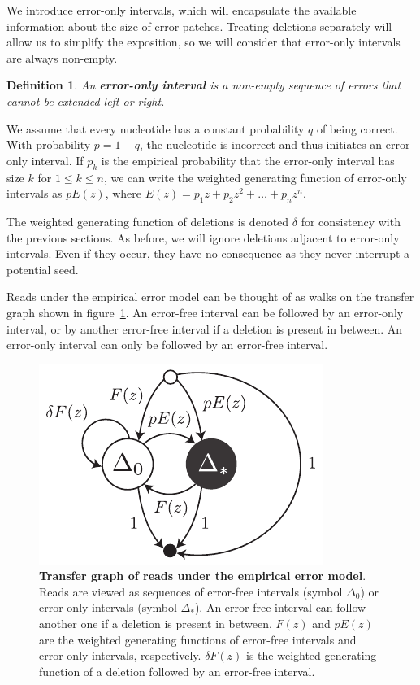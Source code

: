 \documentclass{article}
\newtheorem{definition}{Definition}
\begin{document}
We introduce error-only intervals, which will encapsulate the available
information about the size of error patches. Treating deletions separately
will allow us to simplify the exposition, so we will consider that
error-only intervals are always non-empty.

\begin{definition}
\label{def:error-interval}
An \textbf{error-only interval} is a non-empty sequence of errors that
cannot be extended left or right.
\end{definition}

We assume that every nucleotide has a constant probability $q$ of being
correct. With probability $p = 1-q$, the nucleotide is incorrect and thus
initiates an error-only interval. If  $p_k$ is the empirical probability
that the error-only interval has size $k$ for $1 \leq k \leq n$, we can
write the weighted generating function of error-only intervals as $pE(z)$,
where $E(z) = p_1z + p_2z^2 + \ldots + p_nz^n$.

The weighted generating function of deletions is denoted $\delta$ for
consistency with the previous sections. As before, we will ignore
deletions adjacent to error-only intervals. Even if they occur, they have
no consequence as they never interrupt a potential seed.

Reads under the empirical error model can be thought of as walks on the
transfer graph shown in figure~\ref{fig:empirical}.
An error-free interval can be followed by an error-only interval, or by
another error-free interval if a deletion is present in between. An
error-only interval can only be followed by an error-free interval.

\begin{figure}[h]
\centering
\includegraphics[scale=0.9]{empirical.pdf}
\caption{\textbf{Transfer graph of reads under the empirical error model}.
Reads are viewed as sequences of error-free intervals (symbol $\Delta_0$)
or error-only intervals (symbol $\Delta_*$). An error-free interval can
follow another one if a deletion is present in between. $F(z)$ and $pE(z)$
are the weighted generating functions of error-free intervals and
error-only intervals, respectively. $\delta F(z)$ is the weighted
generating function of a deletion followed by an error-free interval.}
\label{fig:empirical}
\end{figure}
\end{document}
